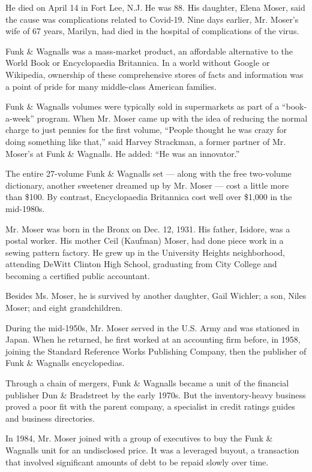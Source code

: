 He died on April 14 in Fort Lee, N.J. He was 88. His daughter, Elena
Moser, said the cause was complications related to Covid-19. Nine days
earlier, Mr. Moser's wife of 67 years, Marilyn, had died in the hospital
of complications of the virus.

Funk \& Wagnalls was a mass-market product, an affordable alternative to
the World Book or Encyclopaedia Britannica. In a world without Google or
Wikipedia, ownership of these comprehensive stores of facts and
information was a point of pride for many middle-class American
families.

Funk \& Wagnalls volumes were typically sold in supermarkets as part of
a ``book-a-week'' program. When Mr. Moser came up with the idea of
reducing the normal charge to just pennies for the first volume,
``People thought he was crazy for doing something like that,'' said
Harvey Strackman, a former partner of Mr. Moser's at Funk \& Wagnalls.
He added: ``He was an innovator.''

The entire 27-volume Funk \& Wagnalls set --- along with the free
two-volume dictionary, another sweetener dreamed up by Mr. Moser ---
cost a little more than \$100. By contrast, Encyclopaedia Britannica
cost well over \$1,000 in the mid-1980s.

Mr. Moser was born in the Bronx on Dec. 12, 1931. His father, Isidore,
was a postal worker. His mother Ceil (Kaufman) Moser, had done piece
work in a sewing pattern factory. He grew up in the University Heights
neighborhood, attending DeWitt Clinton High School, graduating from City
College and becoming a certified public accountant.

Besides Ms. Moser, he is survived by another daughter, Gail Wichler; a
son, Niles Moser; and eight grandchildren.

During the mid-1950s, Mr. Moser served in the U.S. Army and was
stationed in Japan. When he returned, he first worked at an accounting
firm before, in 1958, joining the Standard Reference Works Publishing
Company, then the publisher of Funk \& Wagnalls encyclopedias.

Through a chain of mergers, Funk \& Wagnalls became a unit of the
financial publisher Dun \& Bradstreet by the early 1970s. But the
inventory-heavy business proved a poor fit with the parent company, a
specialist in credit ratings guides and business directories.

In 1984, Mr. Moser joined with a group of executives to buy the Funk \&
Wagnalls unit for an undisclosed price. It was a leveraged buyout, a
transaction that involved significant amounts of debt to be repaid
slowly over time.

